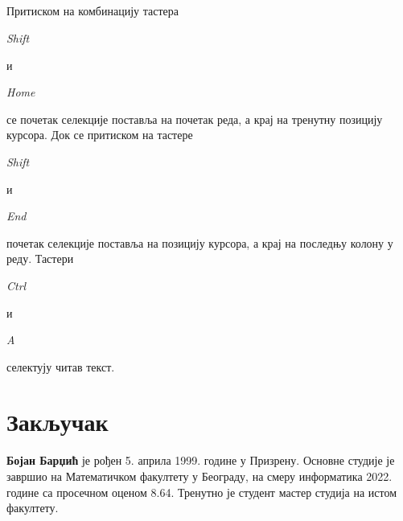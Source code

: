\documentclass[12pt,oneside]{memoir}
\begin{document}
\paragraph{}
Притиском на комбинацију тастера \begin{latinica}\textit{Shift}\end{latinica} и
\begin{latinica}\textit{Home}\end{latinica} се почетак селекције поставља на почетак реда,
а крај на тренутну позицију курсора. Док се притиском на тастере 
\begin{latinica}\textit{Shift}\end{latinica} и \begin{latinica}\textit{End}\end{latinica}
почетак селекције поставља на позицију курсора, а крај на последњу колону у реду.
Тастери \begin{latinica}\textit{Ctrl}\end{latinica} и
\begin{latinica}\textit{A}\end{latinica} селектују читав текст.





\chapter{Закључак}
\pangrami

\literatura

\backmatter

\begin{biografija}
\textbf{Бојан Барџић} је рођен 5. априла 1999. године у Призрену. Основне студије
је завршио на Математичком факултету у Београду, на смеру информатика 2022. године
са просечном оценом 8.64. Тренутно је студент мастер студија на истом факултету.
\end{biografija}
\end{document}
